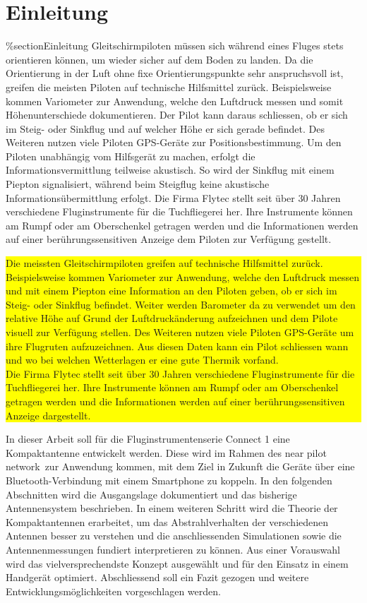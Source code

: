\newpage
\chapter{Einleitung}
\%section{Einleitung}
Gleitschirmpiloten müssen sich während eines Fluges stets orientieren können, um wieder sicher auf dem Boden zu landen. Da die Orientierung in der Luft ohne fixe Orientierungspunkte sehr anspruchsvoll ist, greifen die meisten Piloten auf technische Hilfsmittel zurück. Beispielsweise kommen Variometer zur Anwendung, welche den Luftdruck messen und somit Höhenunterschiede dokumentieren. Der Pilot kann daraus schliessen, ob er sich im Steig- oder Sinkflug  und auf welcher Höhe er sich gerade befindet. Des Weiteren nutzen viele Piloten GPS-Geräte zur Positionsbestimmung. Um den Piloten unabhängig vom Hilfsgerät zu machen, erfolgt die Informationsvermittlung teilweise akustisch. So wird der Sinkflug  mit einem Piepton signalisiert, während beim Steigflug keine akustische Informationsübermittlung erfolgt. Die Firma Flytec stellt seit über 30 Jahren verschiedene Fluginstrumente für die Tuchfliegerei her. Ihre Instrumente können am Rumpf oder am Oberschenkel getragen werden und die Informationen werden auf einer berührungssensitiven Anzeige dem Piloten zur Verfügung gestellt.\\

\colorbox{yellow}{\parbox[t]{\textwidth}{
Die meissten Gleitschirmpiloten greifen auf technische Hilfsmittel zurück. Beispielsweise kommen Variometer zur Anwendung, welche den Luftdruck messen und mit einem Piepton eine Information an den Piloten geben, ob er sich im Steig- oder Sinkflug befindet. Weiter werden Barometer da zu verwendet um den relative Höhe auf Grund der Luftdruckänderung aufzeichnen und dem Pilote visuell zur Verfügung stellen. Des Weiteren nutzen viele Piloten GPS-Geräte um ihre Flugruten aufzuzeichnen. Aus diesen Daten kann ein Pilot schliessen wann und wo bei welchen Wetterlagen er eine gute Thermik vorfand.\\ 
Die Firma Flytec stellt seit über 30 Jahren verschiedene Fluginstrumente für die Tuchfliegerei her. Ihre Instrumente können am Rumpf oder am Oberschenkel getragen werden und die Informationen werden auf einer berührungssensitiven Anzeige dargestellt.\\
}}

In dieser Arbeit soll für die Fluginstrumentenserie \glqq Connect 1 \grqq eine Kompaktantenne entwickelt werden. Diese wird im Rahmen des \glqq near pilot network\grqq \ zur Anwendung kommen, mit dem Ziel in Zukunft die Geräte  über eine Bluetooth-Verbindung mit einem Smartphone zu koppeln. In den folgenden Abschnitten wird die Ausgangslage dokumentiert und das bisherige Antennensystem beschrieben. In einem weiteren Schritt wird die Theorie der Kompaktantennen erarbeitet, um das Abstrahlverhalten der verschiedenen Antennen besser zu verstehen und die anschliessenden Simulationen sowie die Antennenmessungen fundiert interpretieren zu können. Aus einer Vorauswahl wird das vielversprechendste Konzept ausgewählt und für den Einsatz in einem Handgerät optimiert. Abschliessend soll ein Fazit gezogen und weitere Entwicklungsmöglichkeiten vorgeschlagen werden.

